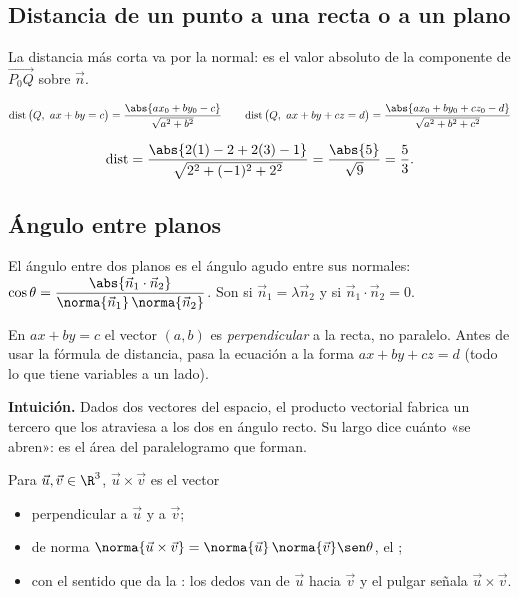 \documentclass[11pt,a4paper]{article}
\let\nivelbase\nivel
\renewcommand{\nivel}[2]{\Needspace{8\baselineskip}\nivelbase{#1}{#2}}
\newcommand{\dist}{\operatorname{dist}}
\newcommand{\vu}{\vec{u}}\def\vv{\vec{v}}\newcommand{\vw}{\vec{w}}\newcommand{\vn}{\vec{n}}
\begin{document}
\subsection{Distancia de un punto a una recta o a un plano}
La distancia más corta va por la normal: es el valor absoluto de la componente de $\overrightarrow{P_0Q}$ sobre $\vn$.
\begin{clavebox}
$\displaystyle \dist\big(Q,\ ax+by=c\big)=\frac{\abs{ax_0+by_0-c}}{\sqrt{a^2+b^2}}\qquad
\dist\big(Q,\ ax+by+cz=d\big)=\frac{\abs{ax_0+by_0+cz_0-d}}{\sqrt{a^2+b^2+c^2}}$
\end{clavebox}
\begin{ejemplo}[Del video: de $(1,2,3)$ al plano $2x-y+2z=1$]
\[ \dist=\frac{\abs{2(1)-2+2(3)-1}}{\sqrt{2^2+(-1)^2+2^2}}=\frac{\abs{5}}{\sqrt9}=\frac53 . \]
\end{ejemplo}

\subsection{Ángulo entre planos}
\begin{propiedad}
El ángulo entre dos planos es el ángulo agudo entre sus normales:
$\cos\theta=\dfrac{\abs{\vn_1\cdot\vn_2}}{\norma{\vn_1}\,\norma{\vn_2}}$.
Son  si $\vn_1=\lambda\vn_2$ y  si $\vn_1\cdot\vn_2=0$.
\end{propiedad}
\begin{ojo}
En $ax+by=c$ el vector $(a,b)$ es \emph{perpendicular} a la recta, no paralelo. Antes de usar la fórmula de
distancia, pasa la ecuación a la forma $ax+by+cz=d$ (todo lo que tiene variables a un lado).
\end{ojo}


\textbf{Intuición.} Dados dos vectores del espacio, el producto vectorial fabrica un tercero que los atraviesa a los
dos en ángulo recto. Su largo dice cuánto «se abren»: es el área del paralelogramo que forman.

\begin{definicion}
Para $\vu,\vv\in\R^3$, $\vu\times\vv$ es el vector
\begin{itemize}
\item perpendicular a $\vu$ y a $\vv$;
\item de norma $\norma{\vu\times\vv}=\norma{\vu}\,\norma{\vv}\sen\theta$, el ;
\item con el sentido que da la : los dedos van de $\vu$ hacia $\vv$ y el pulgar señala $\vu\times\vv$.
\end{itemize}
\end{definicion}
\end{document}
